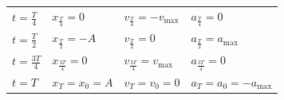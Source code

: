 \documentclass[
]{book}
\begin{document}
\begin{longtable}[]{@{}llll@{}}
\begin{minipage}[t]{0.22\columnwidth}
\(t = \frac{T}{4}\)\strut
\end{minipage} & \begin{minipage}[t]{0.22\columnwidth}\raggedright
\(x_{\frac{T}{4}} = 0\)\strut
\end{minipage} & \begin{minipage}[t]{0.22\columnwidth}\raggedright
\(v_{\frac{T}{4}} = -v_\textrm{max}\)\strut
\end{minipage} & \begin{minipage}[t]{0.22\columnwidth}\raggedright
\(a_{\frac{T}{4}} = 0\)\strut
\end{minipage}\tabularnewline
\begin{minipage}[t]{0.22\columnwidth}\raggedright
\(t = \frac{T}{2}\)\strut
\end{minipage} & \begin{minipage}[t]{0.22\columnwidth}\raggedright
\(x_{\frac{T}{2}} = -A\)\strut
\end{minipage} & \begin{minipage}[t]{0.22\columnwidth}\raggedright
\(v_{\frac{T}{2}} = 0\)\strut
\end{minipage} & \begin{minipage}[t]{0.22\columnwidth}\raggedright
\(a_{\frac{T}{2}} = a_{\textrm{max}}\)\strut
\end{minipage}\tabularnewline
\begin{minipage}[t]{0.22\columnwidth}\raggedright
\(t = \frac{3T}{4}\)\strut
\end{minipage} & \begin{minipage}[t]{0.22\columnwidth}\raggedright
\(x_{\frac{3T}{4}} = 0\)\strut
\end{minipage} & \begin{minipage}[t]{0.22\columnwidth}\raggedright
\(v_{\frac{3T}{4}} = v_\textrm{max}\)\strut
\end{minipage} & \begin{minipage}[t]{0.22\columnwidth}\raggedright
\(a_{\frac{3T}{4}} = 0\)\strut
\end{minipage}\tabularnewline
\begin{minipage}[t]{0.22\columnwidth}\raggedright
\(t = T\)\strut
\end{minipage} & \begin{minipage}[t]{0.22\columnwidth}\raggedright
\(x_T = x_0 = A\)\strut
\end{minipage} & \begin{minipage}[t]{0.22\columnwidth}\raggedright
\(v_T = v_0 = 0\)\strut
\end{minipage} & \begin{minipage}[t]{0.22\columnwidth}\raggedright
\(a_T = a_0 = -a_{\textrm{max}}\)\strut
\end{minipage}\tabularnewline
\bottomrule
\end{longtable}
\end{document}
